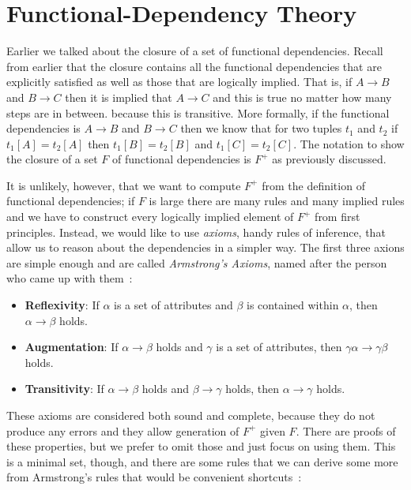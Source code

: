 




\section*{Functional-Dependency Theory}

Earlier we talked about the closure of a set of functional dependencies. Recall from earlier that the closure contains all the functional dependencies that are explicitly satisfied as well as those that are logically implied. That is, if $A \rightarrow B$ and $B \rightarrow C$ then it is implied that $A \rightarrow C$ and this is true no matter how many steps are in between. because this is transitive. More formally, if the functional dependencies is $A \rightarrow B$ and $B \rightarrow C$ then we know that for two tuples $t_{1}$ and $t_{2}$ if $t_{1}[A] = t_{2}[A]$ then $t_{1}[B] = t_{2}[B]$ and $t_{1}[C] = t_{2}[C]$. The notation to show the closure of a set $F$ of functional dependencies is $F^{+}$ as previously discussed.

It is unlikely, however, that we want to compute $F^{+}$ from the definition of functional dependencies; if $F$ is large there are many rules and many implied rules and we have to construct every logically implied element of $F^{+}$ from first principles. Instead, we would like to use \textit{axioms}, handy rules of inference, that allow us to reason about the dependencies in a simpler way. The first three axions are simple enough and are called \textit{Armstrong's Axioms}, named after the person who came up with them~\cite{dsc}:

\begin{itemize}
	\item \textbf{Reflexivity}: If $\alpha$ is a set of attributes and $\beta$ is contained within $\alpha$, then $\alpha \rightarrow \beta$ holds.
	\item \textbf{Augmentation}: If $\alpha \rightarrow \beta$ holds and $\gamma$ is a set of attributes, then $\gamma\alpha \rightarrow \gamma\beta$ holds.
	\item \textbf{Transitivity}: If $\alpha \rightarrow \beta$ holds and $\beta \rightarrow \gamma$ holds, then $\alpha \rightarrow \gamma$ holds.
\end{itemize}

These axioms are considered both sound and complete, because they do not produce any errors and they allow generation of $F^{+}$ given $F$. There are proofs of these properties, but we prefer to omit those and just focus on using them. This is a minimal set, though, and there are some rules that we can derive some more from Armstrong's rules that would be convenient shortcuts~\cite{dsc}:

